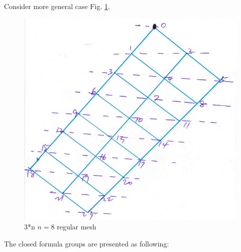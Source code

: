 Consider more general case Fig. \ref{38f}.

\begin{figure}[h]
\centering\includegraphics[width=0.7\linewidth]{figure/c38_f}
\caption{3*n $n = 8$ regular mesh}
\label{38f}
\end{figure}

The closed formula groups are presented as following:

